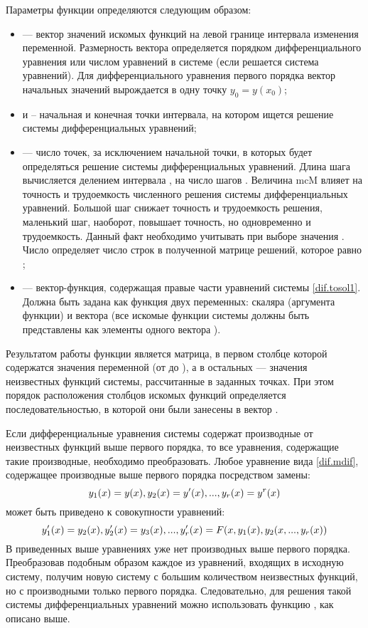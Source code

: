 Параметры функции  определяются следующим образом:
 \begin{itemize}[label={}]
 	\item {} --- вектор значений искомых функций на левой границе интервала изменения переменной. Размерность вектора определяется порядком дифференциального уравнения или числом уравнений в системе (если решается система уравнений). Для дифференциального уравнения первого порядка вектор начальных значений вырождается в одну точку $y_0 = y(x_0)$;
 	\item {} и  – начальная и конечная точки интервала, на котором ищется решение системы дифференциальных уравнений;
 	\item {} --- число точек, за исключением начальной точки, в которых будет определяться решение системы дифференциальных уравнений. Длина шага вычисляется делением интервала , на число шагов . Величина mc{M} влияет на точность и трудоемкость численного решения системы дифференциальных уравнений. Большой шаг снижает точность и трудоемкость решения, маленький шаг, наоборот, повышает точность, но одновременно и трудоемкость. Данный факт необходимо учитывать при выборе значения . Число  определяет число строк в полученной матрице решений, которое равно ;
 	\item {} --- вектор-функция, содержащая правые части уравнений системы \ref{dif.tosol1}. Должна быть задана как функция двух переменных: скаляра  (аргумента функции) и вектора  (все искомые функции системы должны быть представлены как элементы одного вектора ).
 \end{itemize}
 
Результатом работы функции  является матрица, в первом столбце которой содержатся значения переменной  (от  до ), а в остальных --- значения неизвестных функций системы, рассчитанные в заданных точках. При этом порядок расположения столбцов искомых функций определяется последовательностью, в которой они были занесены в вектор .

Если дифференциальные уравнения системы содержат производные от неизвестных функций выше первого порядка, то все уравнения, содержащие такие производные, необходимо преобразовать. Любое уравнение вида \ref{dif.mdif}, содержащее производные выше первого порядка посредством замены:
\begin{equation}
	y_1(x)=y(x), \\ y_2(x)=y^{\prime}(x),  ... , y_r(x)=y^r(x)
\end{equation}
может быть приведено к совокупности уравнений:
\begin{equation}
	y_1^{\prime}(x)=y_2(x), \\ y_2^{\prime}(x)=y_3(x), ... , y_r^{\prime}(x)=F(x,y_1(x),y_2(x, ... , y_r(x))
\end{equation}
В приведенных выше уравнениях уже нет производных выше первого порядка. Преобразовав подобным образом каждое из уравнений, входящих в исходную систему, получим новую систему с большим количеством неизвестных функций, но с производными только первого порядка. Следовательно, для решения такой системы дифференциальных уравнений можно использовать функцию , как описано выше.

